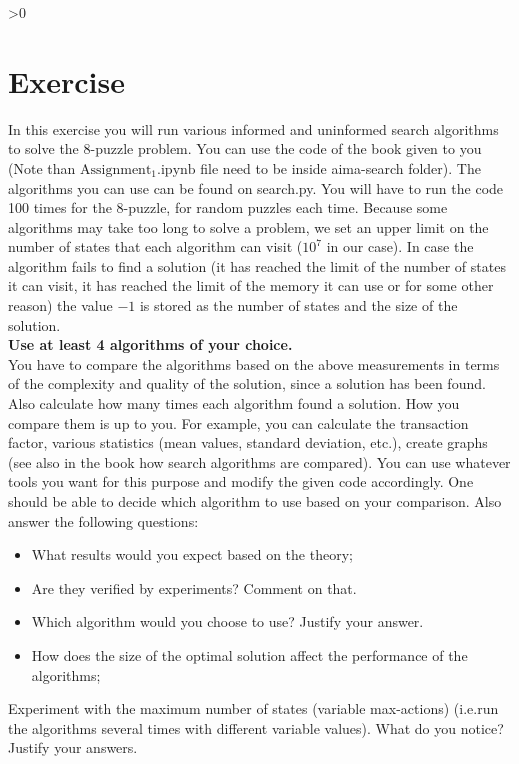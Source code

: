 \documentclass{article}
\newcounter{partCounter}
\newcounter{ExerciseCounter}
\newenvironment{Exercise}[1][-1]{
	\ifnum#1>0
	\setcounter{ExerciseCounter}{#1}
	\fi
	\section{Exercise \arabic{ExerciseCounter}}
	\setcounter{partCounter}{1}
}{
}
\begin{document}
	\begin{Exercise}[4]
		In this exercise you will run various informed and uninformed search algorithms	to solve the 8-puzzle problem. You can use the code of the book given to you (Note than $\mathrm{Assignment_1.ipynb}$ file need to be inside aima-search folder). The algorithms you can use can be found on search.py. You will have to run the code 100 times for the 8-puzzle, for random puzzles each time. Because some algorithms may take too long to solve a problem, we set an upper limit on the number of states that each algorithm can visit ($10^7$ in our case). In case the	algorithm fails to find a solution (it has reached the limit of the number of states it can visit, it has reached the limit of the memory it can use or for some other reason) the value $-1$ is stored as the number of states and the size of the solution. \\
		
		\textbf{Use at least 4 algorithms of your choice.} \\
		
		You have to compare the algorithms based on the above measurements in terms of the complexity and quality of the solution, since a solution has been found. Also calculate how many times each algorithm found a solution. How you compare them is up to you. For example, you can calculate the transaction factor, various statistics (mean values, standard deviation, etc.), create graphs (see also in the book how search algorithms are compared). You can use whatever tools you want for this purpose and modify the given code accordingly. One should be able to decide which algorithm to use based on your comparison. Also answer the following questions: \\
		
		\begin{itemize}
			\item What results would you expect based on the theory;
			\item Are they verified by experiments? Comment on that.
			\item Which algorithm would you choose to use? Justify your answer.
			\item How does the size of the optimal solution affect the performance of the
			algorithms;
		\end{itemize}
	
		Experiment with the maximum number of states (variable max-actions) (i.e.run the algorithms several times with different variable values). What do you notice? Justify your answers. \\
		
	\end{Exercise}
\end{document}
